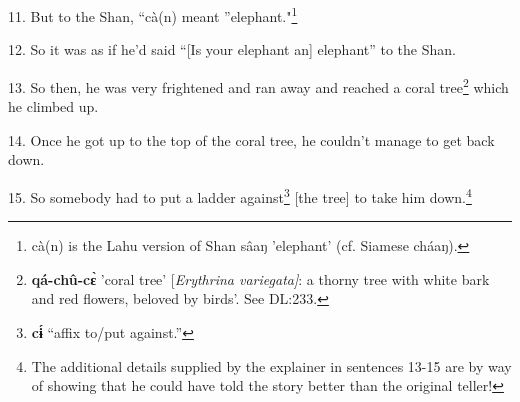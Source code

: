 11. But to the Shan, ``cà(n) meant ''elephant."\footnote{cà(n) is the Lahu version of Shan sâaŋ 'elephant' (cf. Siamese cháaŋ).}

12. So it was as if he'd said ``[Is your elephant an] elephant''
to the Shan.

13. So then, he was very frightened and ran away and reached a coral tree\footnote{\textbf{qá-chû-cɛ̀} 'coral tree' [\textit{Erythrina variegata]}: a thorny tree with white bark and red flowers, beloved by birds'. See DL:233.}
which he climbed up.

14. Once he got up to the top of the coral tree, he couldn't manage to get back
down.

15. So somebody had to put a ladder against\footnote{\textbf{cɨ́} ``affix to/put against.''} [the tree] to take him down.\footnote{The additional details supplied by the explainer in sentences 13-15 are by way of showing that he could have told the story better than the original teller!}

